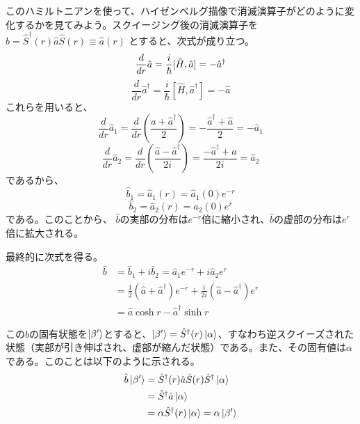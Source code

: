 このハミルトニアンを使って、ハイゼンベルグ描像で消滅演算子がどのように変化するかを見てみよう。スクイージング後の消滅演算子を$\hat b = \hat S^\dagger(r)\hat a\hat S(r) \equiv \hat a(r)$
とすると、次式が成り立つ。
\begin{equation}
  	\frac{d}{dr}\hat a = \frac{i}{\hbar}[\hat H, \hat a] = -\hat a^\dagger\\
\end{equation}
\begin{equation}
    	\frac{d}{dr}\hat a^\dagger = \frac{i}{\hbar}[\hat H, \hat a^\dagger] = -\hat a
\end{equation}
これらを用いると、
\begin{equation}
  \frac{d}{dr}\hat a_1 = \frac{d}{dr} \left(\frac {\hat a + \hat a^\dagger}{2}\right) = -\frac {\hat a^\dagger + \hat a}{2} = -\hat a_1
\end{equation}
\begin{equation}
  \frac{d}{dr}\hat a_2 = \frac{d}{dr} \left(\frac {\hat a - \hat a^\dagger}{2i}\right) = \frac {-\hat a^\dagger + \hat a}{2i}= \hat a_2
\end{equation}
であるから、
\begin{equation}
  \hat b_1 = \hat a_1(r) = \hat a_1(0) e^{-r}
\end{equation}
\begin{equation}
  \hat b_2 = \hat a_2(r) = \hat a_2(0) e^r
\end{equation}
である。このことから、
$\hat b$の実部の分布は$e^{-r}$倍に縮小され、$\hat b$の虚部の分布は$e^{r}$倍に拡大される。

最終的に次式を得る。
\begin{equation}
\begin{aligned}
  \hat b &= \hat b_1 + i\hat b_2 = \hat a_1 e^{-r} + i\hat a_2 e^r \\
  &= \frac{1}{2} (\hat a + \hat a^\dagger)e^{-r} + \frac{i}{2i}(\hat a - \hat a^\dagger)e^{r}\\
  &= \hat a \cosh r - \hat a^\dagger \sinh r 
\end{aligned}
\end{equation}

この$\hat b$の固有状態を$\ket {\beta'}$とすると、$\ket {\beta'} = \hat S^\dagger(r)\ket \alpha$、すなわち逆スクイーズされた状態（実部が引き伸ばされ、虚部が縮んだ状態）である。また、その固有値は$\alpha$である。このことは以下のように示される。
\begin{equation}
\begin{aligned}
  \hat b\ket {\beta'} &= \hat S^\dagger(r)\hat a \hat S(r) \hat S^\dagger \ket \alpha \\
  &= \hat S^\dagger \hat a \ket \alpha \\
  &= \alpha \hat S^\dagger(r)\ket \alpha = \alpha \ket{\beta'}
\end{aligned}
\end{equation}


